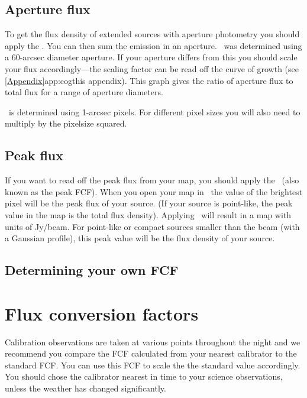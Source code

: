 \subsection{Aperture flux}

To get the flux density of extended sources with aperture photometry
you should apply the \fcfa.  You can then sum the emission in an
aperture. \fcfa\ was determined using a 60-arcsec diameter
aperture. If your aperture differs from this you should scale your
flux accordingly---the scaling factor can be read off the curve of
growth (see \cref{Appendix}{app:cog}{this appendix}). This graph gives
the ratio of aperture flux to total flux for a range of aperture
diameters.

\fcfa\ is determined using 1-arcsec pixels. For different pixel sizes
you will also need to multiply by the pixelsize squared.

\subsection{Peak flux}

If you want to read off the peak flux from your map, you should apply
the \fcfb\ (also known as the peak FCF).  When you open your map in
\gaia\ the value of the brightest pixel will be the peak flux of your
source. (If your source is point-like, the peak value in the map is
the total flux density). Applying \fcfb\ will result in a map with
units of Jy/beam. For point-like or compact sources smaller than the
beam (with a Gaussian profile), this peak value will be the flux
density of your source.

\subsection{Determining your own FCF}\section{Flux conversion factors}
\label{sec:own_fcf}

Calibration observations are taken at various points throughout the
night and we recommend you compare the FCF calculated from your
nearest calibrator to the standard FCF. You can use this FCF to scale
the the standard value accordingly. You should chose the calibrator
nearest in time to your science observations, unless the weather has
changed significantly.

